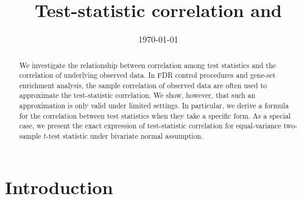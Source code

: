 \documentclass[12pt, a4paper]{article}
\title{Test-statistic correlation and \popucor}
\date{\today} %
\newcommand{\popucor}{the correlation of underlying observed data}
\begin{document}
	
	\maketitle
	
	\begin{abstract}
		We investigate the relationship between correlation among test statistics and \popucor. 
		In FDR control procedures and gene-set enrichment analysis, the sample correlation of 
		observed data are often used to approximate the 
		test-statistic correlation. We show, however, that such an approximation is only valid 
		under 
		limited settings. In particular, we derive a formula for the correlation between test 
		statistics when 
		they take a specific form. As a special case, we present the exact expression of 
		test-statistic 
		correlation for equal-variance two-sample $t$-test statistic under bivariate 
		normal assumption. 
		
		
	\end{abstract}
	
	\section{Introduction}
%	
%
%	
\end{document}
